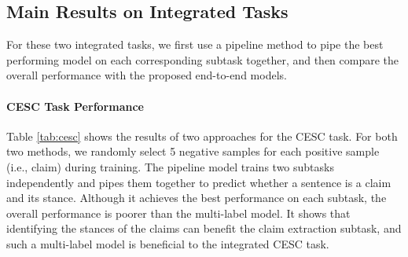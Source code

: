 \documentclass[11pt]{article}
\begin{document}
\subsection{Main Results on Integrated Tasks}

For these two integrated tasks, we first use a pipeline method to pipe the best performing model on each corresponding subtask together, and then compare the overall performance with the proposed end-to-end models.

\begin{table}[t!]
	\centering
{}
\caption{CESC task performance.}
\label{tab:cesc}
\end{table}


\paragraph{CESC Task Performance}
Table \ref{tab:cesc} shows the results of two approaches for the CESC task.
For both two methods, we randomly select 5 negative samples for each positive sample (i.e., claim) during training.
The pipeline model trains two subtasks independently and pipes them together to predict whether a sentence is a claim and its stance.
Although it achieves the best performance on each subtask, the overall performance is poorer than the multi-label model.
It shows that identifying the stances of the claims can benefit the claim extraction subtask, and such a multi-label model is beneficial to the integrated CESC task.



\begin{table}[t!]
	\centering
{}
\caption{CEPE task performance.}
	\label{tab:cepe}
\end{table}
\end{document}
